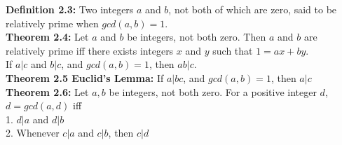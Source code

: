 \documentclass[14pt]{extreport}
\begin{document}
\textbf{Definition 2.3:} Two integers $a$ and $b$, not both of which are zero, said to be relatively prime when $gcd(a,b) = 1$.\\

\textbf{Theorem 2.4:} Let $a$ and $b$ be integers, not both zero. Then $a$ and $b$ are relatively prime iff there exists integers $x$ and $y$ such that $1 = ax+by$.\\

If $a|c$ and  $b|c$, and $gcd(a,b) = 1$, then $ab|c$.\\

\textbf{Theorem 2.5 Euclid's Lemma:} If $a|bc$, and $gcd(a,b) = 1$, then $a|c$\\

\textbf{Theorem 2.6:} Let $a, b$ be integers, not both zero. For a positive integer $d$,  $d = gcd(a,d)$ iff\\

1. $d|a$ and $d|b$\\
2. Whenever $c|a$ and $c|b$, then $c|d$\\
\end{document}
